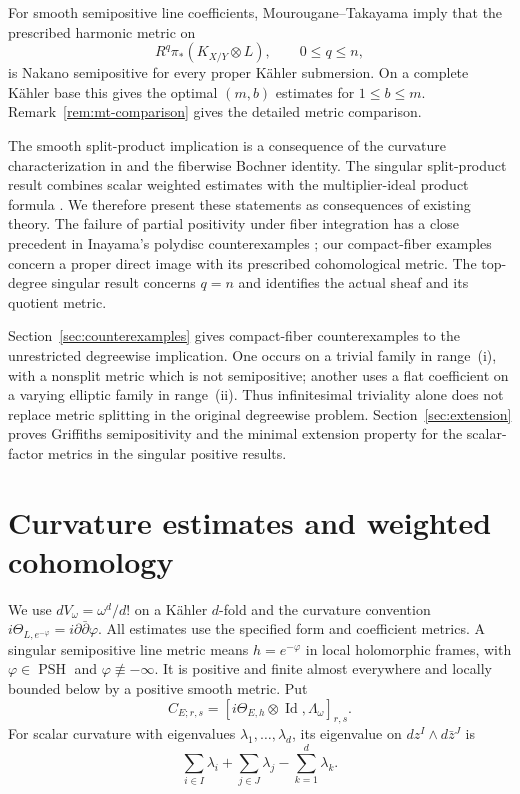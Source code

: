 \documentclass[11pt,reqno]{amsart}
\numberwithin{equation}{section}
\theoremstyle{definition}
\theoremstyle{remark}
\newcommand{\Id}{\operatorname{Id}}
\begin{document}
For smooth semipositive line coefficients, Mourougane--Takayama
\cite[Theorem~1.1]{MT08} imply that the prescribed harmonic metric on
\[
 R^q\pi_*(K_{X/Y}\otimes L),\qquad 0\le q\le n,
\]
is Nakano semipositive for every proper K\"ahler submersion.
On a complete K\"ahler base this gives the optimal $(m,b)$ estimates
for $1\le b\le m$.
Remark~\ref{rem:mt-comparison} gives the detailed metric comparison.

The smooth split-product implication is a consequence of the curvature
characterization in \cite{WatCurv} and the fiberwise Bochner identity.
The singular split-product result combines scalar weighted estimates
with the multiplier-ideal product formula \cite{Dem82,DEL00}.
We therefore present these statements as consequences of existing
theory.
The failure of partial positivity under fiber integration has a close
precedent in Inayama's polydisc counterexamples
\cite[Theorem~1.1]{Ina26}; our compact-fiber examples concern a proper
direct image with its prescribed cohomological metric.
The top-degree singular result concerns $q=n$ and identifies the
actual sheaf and its quotient metric.

Section~\ref{sec:counterexamples} gives compact-fiber counterexamples
to the unrestricted degreewise implication.  One occurs on a trivial
family in range~\textnormal{(i)}, with a nonsplit metric which is not
semipositive; another uses a flat coefficient on a varying elliptic
family in range~\textnormal{(ii)}.  Thus infinitesimal triviality alone
does not replace metric splitting in the original degreewise problem.
Section~\ref{sec:extension} proves Griffiths semipositivity and the
minimal extension property for the scalar-factor metrics in the
singular positive results.


\section{Curvature estimates and weighted cohomology}\label{sec:analytic}

We use $dV_\omega=\omega^d/d!$ on a K\"ahler $d$-fold and the
curvature convention $i\Theta_{L,e^{-\varphi}}=i\partial\bar\partial\varphi$.
All estimates use the specified form and coefficient metrics.
A singular semipositive line metric
means $h=e^{-\varphi}$ in local holomorphic frames, with
$\varphi\in\operatorname{PSH}$ and $\varphi\not\equiv-\infty$.
It is positive and finite almost everywhere and locally bounded below
by a positive smooth metric.  Put
\[
 C_{E;r,s}=[i\Theta_{E,h}\otimes\Id,\Lambda_\omega]_{r,s}.
\]
For scalar curvature with eigenvalues $\lambda_1,\ldots,\lambda_d$,
its eigenvalue on $dz^I\wedge d\bar z^J$ is
\begin{equation}\label{eq:commutator-eigenvalue}
 \sum_{i\in I}\lambda_i+\sum_{j\in J}\lambda_j
       -\sum_{k=1}^d\lambda_k.
\end{equation}
\end{document}
